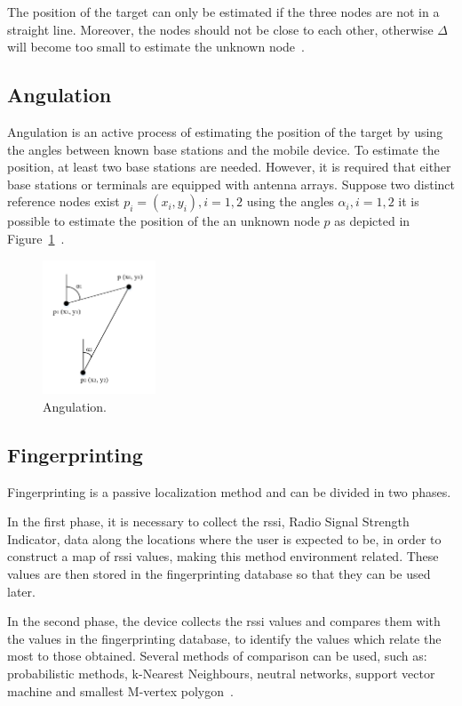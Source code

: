The position of the target can only be estimated if the three nodes are not in a straight line. Moreover, the nodes should not be close to each other, otherwise $\Delta$ will become too small to estimate the unknown node~\citep{novelref}.

\subsection{Angulation}
\label{subsection:angulation}
Angulation is an active process of estimating the position of the target by using the angles between known base stations and the mobile device. To estimate the position, at least two base stations are needed. However, it is required that either base stations or terminals are equipped with antenna arrays. Suppose two distinct reference nodes exist $p_{i}=\left ( x_{i},y_{i} \right ),i =1,2$ using the angles $\alpha_{i}, i=1,2$ it is possible to estimate the position of the an unknown node $p$ as depicted in Figure~\ref{fig:angulation}~\citep{KupperAxel}.
\begin{figure}[!htb]
  \centering
  \includegraphics[width=0.3\textwidth]{Figures/ang.png}
  \caption[Angulation]{Angulation.}
  \label{fig:angulation}
\end{figure}

\subsection{Fingerprinting}
\label{subsection:fingerprinting}
Fingerprinting is a passive localization method and can be divided in two phases.

In the first phase, it is necessary to collect the \gls{rssi}, Radio Signal Strength Indicator, data along the locations where the user is expected to be, in order to construct a map of \gls{rssi} values, making this method environment related. These values are then stored in the fingerprinting database so that they can be used later. 
 
In the second phase, the device collects the \gls{rssi} values and compares them with the values in the fingerprinting database, to identify the values which relate the most to those obtained. Several methods of comparison can be used, such as: probabilistic methods, k-Nearest Neighbours, neutral networks, support vector machine and smallest M-vertex polygon~\citep{ImprIndoorLocal}.

